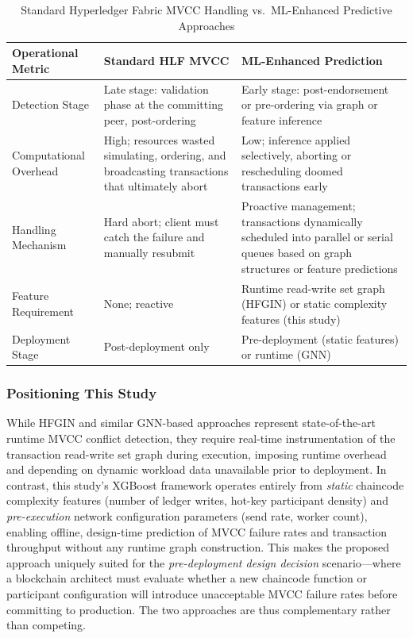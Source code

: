 \documentclass[12pt]{article}
\begin{document}
\begin{table}[htbp]
\centering
\caption{Standard Hyperledger Fabric MVCC Handling vs.\ ML-Enhanced Predictive Approaches}
\label{tab:mvcc_comparison}
\small
\begin{tabular}{p{2.8cm}p{4.5cm}p{4.5cm}}
\hline
\textbf{Operational Metric} & \textbf{Standard HLF MVCC} & \textbf{ML-Enhanced Prediction} \\
\hline
Detection Stage & Late stage: validation phase at the committing peer, post-ordering \citep{debreczeni_transaction_2024} & Early stage: post-endorsement or pre-ordering via graph or feature inference \citep{alzahrani_hfgin_2025} \\
\hline
Computational Overhead & High; resources wasted simulating, ordering, and broadcasting transactions that ultimately abort \citep{alzahrani_hfgin_2025} & Low; inference applied selectively, aborting or rescheduling doomed transactions early \citep{alzahrani_hfgin_2025} \\
\hline
Handling Mechanism & Hard abort; client must catch the failure and manually resubmit \citep{debreczeni_transaction_2024} & Proactive management; transactions dynamically scheduled into parallel or serial queues based on graph structures or feature predictions \citep{alzahrani_hfgin_2025} \\
\hline
Feature Requirement & None; reactive & Runtime read-write set graph (HFGIN) or static complexity features (this study) \\
\hline
Deployment Stage & Post-deployment only & Pre-deployment (static features) or runtime (GNN) \\
\hline
\end{tabular}
\end{table}

\subsubsection{Positioning This Study}

While HFGIN and similar GNN-based approaches represent state-of-the-art runtime MVCC conflict detection, they require real-time instrumentation of the transaction read-write set graph during execution, imposing runtime overhead and depending on dynamic workload data unavailable prior to deployment. In contrast, this study's XGBoost framework operates entirely from \textit{static} chaincode complexity features (number of ledger writes, hot-key participant density) and \textit{pre-execution} network configuration parameters (send rate, worker count), enabling offline, design-time prediction of MVCC failure rates and transaction throughput without any runtime graph construction. This makes the proposed approach uniquely suited for the \textit{pre-deployment design decision} scenario---where a blockchain architect must evaluate whether a new chaincode function or participant configuration will introduce unacceptable MVCC failure rates before committing to production. The two approaches are thus complementary rather than competing.
\end{document}
